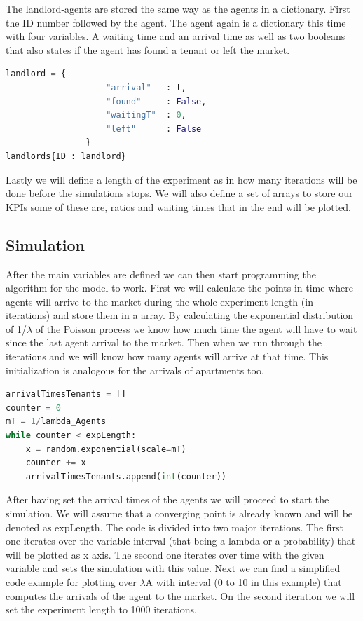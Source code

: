 The landlord-agents are stored the same way as the agents in a dictionary. First the ID number followed by the agent. The agent again is a dictionary this time with four variables. A waiting time and an arrival time as well as two booleans that also states if the agent has found a tenant or left the market.

\begin{lstlisting}[language=Python]
landlord = {
                    "arrival"   : t,
                    "found"     : False,
                    "waitingT"  : 0,
                    "left"      : False
                }
landlords{ID : landlord}
\end{lstlisting}

Lastly we will define a length of the experiment as in how many iterations will be done before the simulations stops. We will also define a set of arrays to store our KPIs some of these are, ratios and waiting times that in the end will be plotted.

\subsection{Simulation}

After the main variables are defined we can then start programming the algorithm for the model to work. First we will calculate the points in time where agents will arrive to the market during the whole experiment length (in iterations) and store them in a array. By calculating the exponential distribution of 1/$\lambda$ of the Poisson process we know how much time the agent will have to wait since the last agent arrival to the market. Then when we run through the iterations and we will know how many agents will arrive at that time. This initialization is analogous for the arrivals of apartments too.
\begin{lstlisting}[language=Python]
arrivalTimesTenants = []
counter = 0
mT = 1/lambda_Agents
while counter < expLength:
    x = random.exponential(scale=mT)
    counter += x
    arrivalTimesTenants.append(int(counter))
\end{lstlisting}

After having set the arrival times of the agents we will proceed to start the simulation. We will assume that a converging point is already known and will be denoted as expLength. The code is divided into two major iterations. The first one iterates over the variable interval (that being a lambda or a probability) that will be plotted as x axis. The second one iterates over time with the given variable and sets the simulation with this value. Next we can find a simplified code example for plotting over $\lambda$A with interval (0 to 10 in this example) that computes the arrivals of the agent to the market. On the second iteration we will set the experiment length to 1000 iterations.

